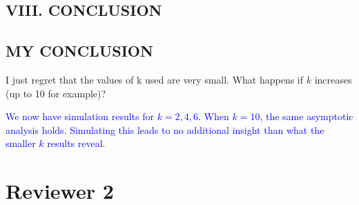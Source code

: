\documentclass[11pt]{article}
\begin{document}
\subsection*{VIII. CONCLUSION}
\subsection*{MY CONCLUSION}
I just regret that the values of k used are very small. What happens if $k$ increases (up to 10 for example)?


\textcolor{blue}{We now have simulation results for $k=2,4,6$. When $k = 10$, the same asymptotic analysis holds. Simulating this leads to no additional insight than what the smaller $k$ results reveal. }

\section*{Reviewer 2}
\end{document}
